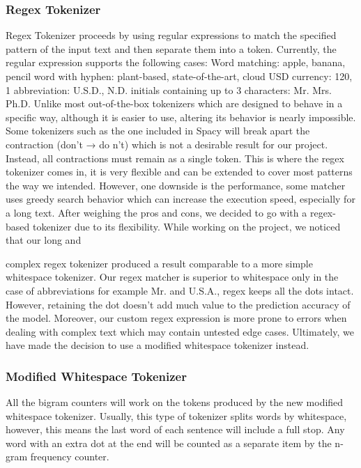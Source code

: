 \documentclass[12pt,oneside,openright,a4paper]{cpe-english-project}
\begin{document}
\subsubsection{Regex Tokenizer}
Regex Tokenizer proceeds by using regular expressions to match the specified pattern of the input text and then separate them into a token. Currently, the regular expression supports the following cases: Word matching: apple, banana, pencil word with hyphen: plant-based, state-of-the-art, cloud USD currency: 120, 1 abbreviation: U.S.D., N.D. initials containing up to 3 characters: Mr. Mrs. Ph.D. Unlike most out-of-the-box tokenizers which are designed to behave in a specific way, although it is easier to use, altering its behavior is nearly impossible. Some tokenizers such as the one included in Spacy will break apart the contraction (don’t → do n’t) which is not a desirable result for our project. Instead, all contractions must remain as a single token. This is where the regex tokenizer comes in, it is very flexible and can be extended to cover most patterns the way we intended. However, one downside is the performance, some matcher uses greedy search behavior which can increase the execution speed, especially for a long text. After weighing the pros and cons, we decided to go with a regex-based tokenizer due to its flexibility. While working on the project, we noticed that our long and

complex regex tokenizer produced a result comparable to a more simple whitespace tokenizer. Our regex matcher is superior to whitespace only in the case of abbreviations for example Mr. and U.S.A., regex keeps all the dots intact. However, retaining the dot doesn’t add much value to the prediction accuracy of the model. Moreover, our custom regex expression is more prone to errors when dealing with complex text which may contain untested edge cases. Ultimately, we have made the decision to use a modified whitespace tokenizer instead.


\subsubsection{Modified Whitespace Tokenizer}
All the bigram counters will work on the tokens produced by the new modified whitespace tokenizer. Usually, this type of tokenizer splits words by whitespace, however, this means the last word of each sentence will include a full stop. Any word with an extra dot at the end will be counted as a separate item by the n-gram frequency counter. 
\end{document}
